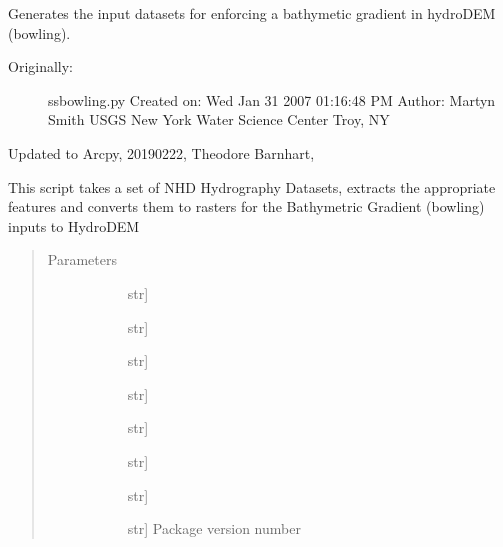 \documentclass[letterpaper,10pt,english]{sphinxmanual}
\begin{document}
\begin{fulllineitems}
\label{\detokenize{make_hydrodem:make_hydrodem.bathymetricGradient}}
Generates the input datasets for enforcing a bathymetic gradient in hydroDEM (bowling).
\begin{description}
\item[{Originally:}] \leavevmode
ssbowling.py
Created on: Wed Jan 31 2007 01:16:48 PM
Author:  Martyn Smith
USGS New York Water Science Center Troy, NY

\end{description}

Updated to Arcpy, 20190222, Theodore Barnhart, 

This script takes a set of NHD Hydrography Datasets, extracts the appropriate
features and converts them to rasters for the Bathymetric Gradient (bowling) inputs to HydroDEM
\begin{quote}\begin{description}
\item[{Parameters}] \leavevmode\begin{description}
\item[{}] \leavevmode{[}str{]}
\item[{}] \leavevmode{[}str{]}
\item[{}] \leavevmode{[}str{]}
\item[{}] \leavevmode{[}str{]}
\item[{}] \leavevmode{[}str{]}
\item[{}] \leavevmode{[}str{]}
\item[{}] \leavevmode{[}str{]}
\item[{}] \leavevmode{[}str{]}
Package version number

\end{description}

\end{description}\end{quote}

\end{fulllineitems}
\end{document}
